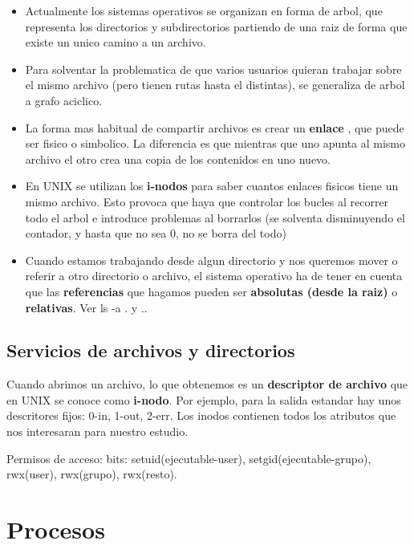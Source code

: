 \documentclass[12pt, letterpaper]{article}
\begin{document}
\begin{itemize}
	\item Actualmente los sistemas operativos se organizan en forma de arbol, que representa los directorios y subdirectorios partiendo de una raiz de forma que existe un unico camino a un archivo.
	\item Para solventar la problematica de que varios usuarios quieran trabajar sobre el mismo archivo (pero tienen rutas hasta el distintas), se generaliza de arbol a grafo aciclico.
	\item La forma mas habitual de compartir archivos es crear un \textbf{enlace} , que puede ser fisico o simbolico. La diferencia es que mientras que uno apunta al mismo archivo el otro crea una copia de los contenidos en uno nuevo.
	\item En UNIX se utilizan los \textbf{i-nodos} para saber cuantos enlaces fisicos tiene un mismo archivo. Esto provoca que haya que controlar los bucles al recorrer todo el arbol e introduce problemas al borrarlos (se solventa disminuyendo el contador, y hasta que no sea 0, no se borra del todo)
	\item Cuando estamos trabajando desde algun directorio y nos queremos mover o referir a otro directorio o archivo, el sistema operativo ha de tener en cuenta que las \textbf{referencias} que hagamos pueden ser \textbf{absolutas (desde la raiz)} o \textbf{relativas}. Ver ls -a . y ..
\end{itemize}

\subsection{Servicios de archivos y directorios}

Cuando abrimos un archivo, lo que obtenemos es un \textbf{descriptor de archivo} que en UNIX se conoce como \textbf{i-nodo}. Por ejemplo, para la salida estandar hay unos descritores fijos: 0-in, 1-out, 2-err. Los inodos contienen todos los atributos que nos interesaran para nuestro estudio.\par
Permisos de acceso: bits: setuid(ejecutable-user), setgid(ejecutable-grupo), rwx(user), rwx(grupo), rwx(resto). \par

\section{Procesos}
\end{document}
